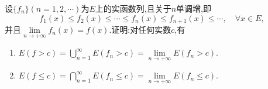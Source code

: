 \documentclass[../../main.tex]{subfiles}%
\begin{document}
\begin{proposition}\label{proposition:递增函数列的集合相关结论2}
设$\{f_n\}(n=1,2,\cdots)$为$E$上的实函数列,且关于$n$单调增,即
\[
f_1(x) \leqslant f_2(x) \leqslant \cdots \leqslant f_n(x) \leqslant f_{n+1}(x) \leqslant \cdots, \quad \forall x \in E,
\]
并且$\lim\limits_{n \to +\infty} f_n(x) = f(x)$.证明:对任何实数$c$,有
\begin{enumerate}[(1)]
\item\label{proposition:递增函数列的集合相关结论2-1} $E(f > c) = \bigcup_{n=1}^{\infty} E(f_n > c) = \lim\limits_{n \to +\infty} E(f_n > c)$.
\item\label{proposition:递增函数列的集合相关结论2-2} $E(f \leqslant c) = \bigcap_{n=1}^{\infty} E(f_n \leqslant c) = \lim\limits_{n \to +\infty} E(f_n \leqslant c)$.
\end{enumerate}
\end{proposition}
\end{document}

